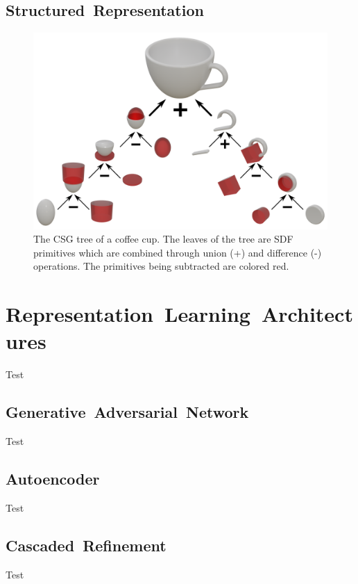 \newpage


\subsection{Structured~Representation}
\label{subsec:structured_representation}

\begin{figure}[ht]
	\centering
	\includegraphics[scale=0.5]{Images/CSG Cup}
	\caption{The CSG tree of a coffee cup. The leaves of the tree are SDF primitives which are combined through union (+) and difference (-) operations. The primitives being subtracted are colored red.}
	\label{fig:csg_cup}
\end{figure}

\newpage


\section{Representation~Learning~Architectures}
\label{sec:representation_learning_architectures}

Test

\subsection{Generative~Adversarial~Network}
\label{subsec:generative_adversarial_networks}

Test

\subsection{Autoencoder}
\label{subsec:autoencoders}

Test

\subsection{Cascaded~Refinement}
\label{subsec:cascaded_refinement}

Test